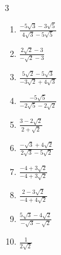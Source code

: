 \begin{multicols}{3}
\begin{enumerate}

  \item $\displaystyle \frac{-5\sqrt{3}-3\sqrt{5}}{4\sqrt{3}-5\sqrt{5}}$


\columnbreak %

\resetques

  \item $\displaystyle \frac{2\sqrt{2}-3}{-\sqrt{2}-3}$


  \item $\displaystyle \frac{5\sqrt{2}-5\sqrt{3}}{-3\sqrt{2}+4\sqrt{3}}$


  \item $\displaystyle \frac{-5\sqrt{5}}{-2\sqrt{5}-2\sqrt{2}}$


  \item $\displaystyle \frac{3-2\sqrt{2}}{2+\sqrt{2}}$


  \item $\displaystyle \frac{-\sqrt{3}+4\sqrt{2}}{2\sqrt{3}-5\sqrt{2}}$


\columnbreak %

  \item $\displaystyle \frac{-4+3\sqrt{2}}{-4+3\sqrt{2}}$

        \phantom{$\displaystyle =1$}

  \item $\displaystyle \frac{2-3\sqrt{2}}{-4+4\sqrt{2}}$


  \item $\displaystyle \frac{5\sqrt{3}-4\sqrt{2}}{-\sqrt{3}-\sqrt{2}}$


  \item $\displaystyle \frac{1}{2\sqrt{2}}$



\end{enumerate}
\end{multicols}
